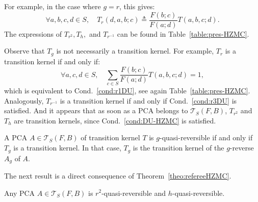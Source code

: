 \documentclass[AHL,Unicode,longabstracts]{cedram}
\newcounter{a}
\newcommand{\Cond}{Cond.}
\newcommand{\triang}[2]{\mathcal{T}_{#1} \left(#2 \right)}
\newcommand{\isdef}{\triangleq}
\let\oldforall\forall
\renewcommand*{\forall}{\mathrel{\oldforall}}
\begin{document}
For example, in the case where $g=r$, this gives:
\begin{equation}\label{eq:rrevtm}
\forall a,b,c,d\in S, \quad T_r(d,a,b;c)\isdef \frac{F(b;c)}{F(a;d)} T(a,b,c;d).
\end{equation}
The expressions of $T_{r^2}, T_{h},$ and $T_{r^{-1}}$ can be found in Table~\ref{table:pres-HZMC}.

Observe that $T_g$ is not necessarily a transition kernel. For example, $T_r$ is a transition kernel if and only if:
\[
\forall a,c,d \in S, \quad \sum_{c\in S} \frac{F(b;c)}{F(a;d)} T(a,b,c;d)=1,
\]
which is equivalent to \Cond~\ref{cond:r1DU}, see again Table~\ref{table:pres-HZMC}. Analogously, $T_{r^{-1}}$ is a transition kernel if and only if \Cond~\ref{cond:r3DU} is satisfied. And it appears that as soon as a PCA belongs to $\triang{S}{F,B}$, $T_{r^2}$ and $T_h$ are transition kernels, since \Cond~\ref{cond:DU-HZMC} is satisfied.

\begin{theo}\label{theo:refereeHZMC}
A PCA $A \in \triang{S}{F,B}$ of transition kernel $T$ is $g$-quasi-reversible if and only if $T_g$ is a transition kernel. In that case, $T_g$ is the transition kernel of the $g$-reverse $A_g$ of $A$.
\end{theo}

The next result is a direct consequence of Theorem~\ref{theo:refereeHZMC}.

\begin{coro}\label{cor:reversibilityHZMC}
Any PCA $A \in \triang{S}{F,B}$ is $r^2$-quasi-reversible and $h$-quasi-reversible.
\end{coro}
\end{document}
